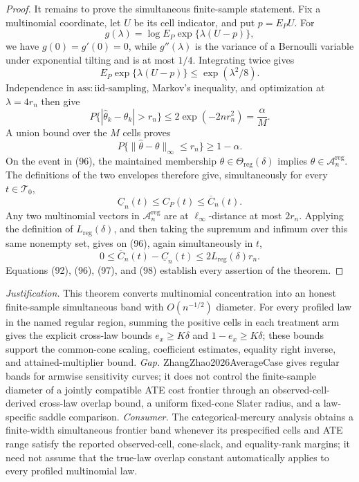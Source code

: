\documentclass{article}
\begin{document}
\begin{proof}
It remains to prove the simultaneous finite-sample statement.  Fix a multinomial coordinate, let \(U\) be its cell indicator, and put \(p=E_PU\).  For
\[
g(\lambda)=\log E_P\exp\{\lambda(U-p)\},
\]
we have \(g(0)=g'(0)=0\), while \(g''(\lambda)\) is the variance of a Bernoulli variable under exponential tilting and is at most \(1/4\).  Integrating twice gives
\[
E_P\exp\{\lambda(U-p)\}\leq\exp(\lambda^2/8).
\tag{94}
\]
Independence in \(\mathrm{ass{:}iid\mbox{-}sampling}\), Markov's inequality, and optimization at \(\lambda=4r_n\) then give
\[
P\{|\widehat\theta_k-\theta_k|>r_n\}
\leq2\exp(-2nr_n^2)=\frac{\alpha}{M}.
\tag{95}
\]
A union bound over the \(M\) cells proves
\[
P\{\|\widehat\theta-\theta\|_\infty\leq r_n\}
\geq1-\alpha.
\tag{96}
\]
On the event in (96), the maintained membership \(\theta\in\Theta_{\mathrm{reg}}(\delta)\) implies \(\theta\in\mathcal A_n^{\mathrm{reg}}\).  The definitions of the two envelopes therefore give, simultaneously for every \(t\in\mathcal T_0\),
\[
\underline C_n(t)\leq C_P(t)\leq\overline C_n(t).
\tag{97}
\]
Any two multinomial vectors in \(\mathcal A_n^{\mathrm{reg}}\) are at \(\ell_\infty\)-distance at most \(2r_n\).  Applying the definition of \(L_{\mathrm{reg}}(\delta)\), and then taking the supremum and infimum over this same nonempty set, gives on (96), again simultaneously in \(t\),
\[
0\leq\overline C_n(t)-\underline C_n(t)
\leq2L_{\mathrm{reg}}(\delta)r_n.
\tag{98}
\]
Equations (92), (96), (97), and (98) establish every assertion of the theorem.
\end{proof}
\par\smallskip\noindent \textit{Justification.} This theorem converts multinomial concentration into an honest finite-sample simultaneous band with \(O(n^{-1/2})\) diameter. For every profiled law in the named regular region, summing the positive cells in each treatment arm gives the explicit cross-law bounds \(e_x\geq K\delta\) and \(1-e_x\geq K\delta\); these bounds support the common-cone scaling, coefficient estimates, equality right inverse, and attained-multiplier bound. \textit{Gap.} ZhangZhao2026AverageCase gives regular bands for armwise sensitivity curves; it does not control the finite-sample diameter of a jointly compatible ATE cost frontier through an observed-cell-derived cross-law overlap bound, a uniform fixed-cone Slater radius, and a law-specific saddle comparison. \textit{Consumer.} The categorical-mercury analysis obtains a finite-width simultaneous frontier band whenever its prespecified cells and ATE range satisfy the reported observed-cell, cone-slack, and equality-rank margins; it need not assume that the true-law overlap constant automatically applies to every profiled multinomial law.
\end{document}
